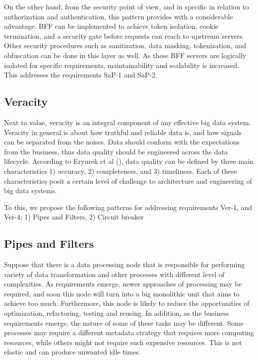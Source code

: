 \documentclass[conference]{IEEEtran}
\begin{document}
On the other hand, from the security point of view, and in specific in relation to authorization and authentication, this pattern provides with a considerable advantage. BFF can be implemented to achieve token isolation, cookie termination, and a security gate before requests can reach to upstream servers. Other security procedures such as sanitization, data masking, tokenization, and obfuscation can be done in this layer as well. As these BFF servers are logically isolated for specific requirements, maintainability and scalability is increased. This addresses the requirements SaP-1 and SaP-2. 


\subsection{Veracity}

Next to value, veracity is an integral component of any effective big data system. Veracity in general is about how truthful and reliable data is, and how signals can be separated from the noises. Data should conform with the expectations from the business, thus data quality should be engineered across the data lifecycle. According to Eryurek et al (\cite{eryurek2021data}), data quality can be defined by three main characteristics 1) accuracy, 2) completeness, and 3) timeliness. Each of these characteristics posit a certain level of challenge to architecture and engineering of big data systems. 

To this, we propose the following patterns for addressing requirements Ver-1, and Ver-4; 1) Pipes and Filters, 2) Circuit breaker 

\subsection{Pipes and Filters}

Suppose that there is a data processing node that is responsible for performing variety of data transformation and other processes with different level of complexities. As requirements emerge, newer approaches of processing may be required, and soon this node will turn into a big monolithic unit that aims to achieve too much. Furthermore, this node is likely to reduce the opportunities of optimization, refactoring, testing and reusing. In addition, as the business requirements emerge, the nature of some of these tasks may be different. Some processes may require a different metadata strategy that requires more computing resources, while others might not require such expensive resources. This is not elastic and can produce unwanted idle times. 
\end{document}
